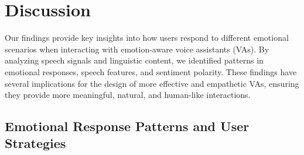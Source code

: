 \section{Discussion}

Our findings provide key insights into how users respond to different emotional scenarios when interacting with emotion-aware voice assistants (VAs). By analyzing speech signals and linguistic content, we identified patterns in emotional responses, speech features, and sentiment polarity. These findings have several implications for the design of more effective and empathetic VAs, ensuring they provide more meaningful, natural, and human-like interactions.

\subsection{Emotional Response Patterns and User Strategies}


